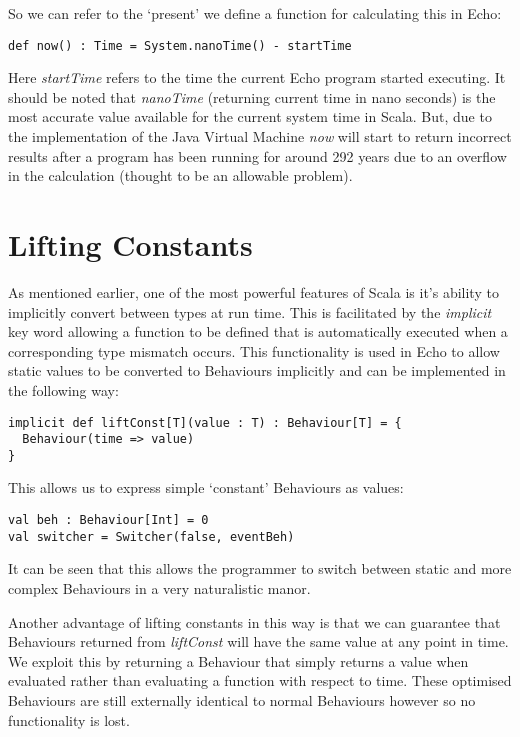     So we can refer to the `present' we define a function for calculating this in Echo:
    
\begin{verbatim}
def now() : Time = System.nanoTime() - startTime
\end{verbatim}      

    Here \emph{startTime} refers to the time the current Echo program started executing. It should be noted that \emph{nanoTime} (returning current time in
    nano seconds) is the most accurate value available for the current system time in Scala. But, due to the
    implementation of the Java Virtual Machine \emph{now} will start to return incorrect results 
    after a program has been running for around 292 years due to an overflow in the calculation (thought to be an allowable
    problem).

  \section{Lifting Constants}
    \label{sec:lift}
    As mentioned earlier, one of the most powerful features of Scala is it's ability to implicitly convert between
    types at run time. This is facilitated by the \emph{implicit} key word allowing a function to be defined
    that is automatically executed when a corresponding type mismatch occurs. This functionality is used in Echo to allow 
    static values to be converted to Behaviours implicitly and can be implemented in the following way:

\begin{verbatim}
implicit def liftConst[T](value : T) : Behaviour[T] = {
  Behaviour(time => value)
}
\end{verbatim}              
    
    This allows us to express simple `constant' Behaviours as values:

\begin{verbatim}
val beh : Behaviour[Int] = 0
val switcher = Switcher(false, eventBeh)
\end{verbatim}       

    It can be seen that this allows the programmer to switch between static and more complex
    Behaviours in a very naturalistic manor.
    
    Another advantage of lifting constants in this way is that we can guarantee that Behaviours
    returned from \emph{liftConst} will have the same value at any point in time. We exploit this by returning a Behaviour
    that simply returns a value when evaluated rather than evaluating a function with respect to time. These optimised Behaviours are still externally identical to normal Behaviours however so no functionality is lost.
    
